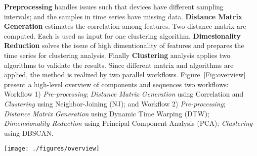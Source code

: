 \textbf{Preprocessing} handles issues such that devices have different sampling intervals; and the samples in time series have missing data. \textbf{Distance Matrix Generation} estimates the correlation among features. Two distance matrix are computed. Each is used as input for one clustering algorithm.  \textbf{Dimesionality Reduction} solves the issue of high dimentionality of features and prepares the time series for clustering analysis. Finally \textbf{Clustering} analysis applies two algorithms to validate the results. Since different matrix and algorithms are applied, the method is realized by two parallel workflows. Figure~\ref{Fig:overview} present a high-level overview of components and sequences two workflows: Workflow 1) \textit{Pre-processing}; \textit{Distance Matrix Generation} using Correlation and \textit{Clustering} using Neighbor-Joining (NJ); and Workflow 2) \textit{Pre-processing}; \textit{Distance Matrix Generation} using Dynamic Time Warping (DTW); \textit{Dimensionality Reduction} using Principal Component Analysis (PCA); \textit{Clustering} using DBSCAN. 


\begin{figure*}
	\texttt{[image: ./figures/overview]}
	\caption{Overview of the multi-stage workflow, from data pre-processing, distance metrics generation, dimentionality reduction, to clustering}
	\label{Fig:overview}
\end{figure*}
